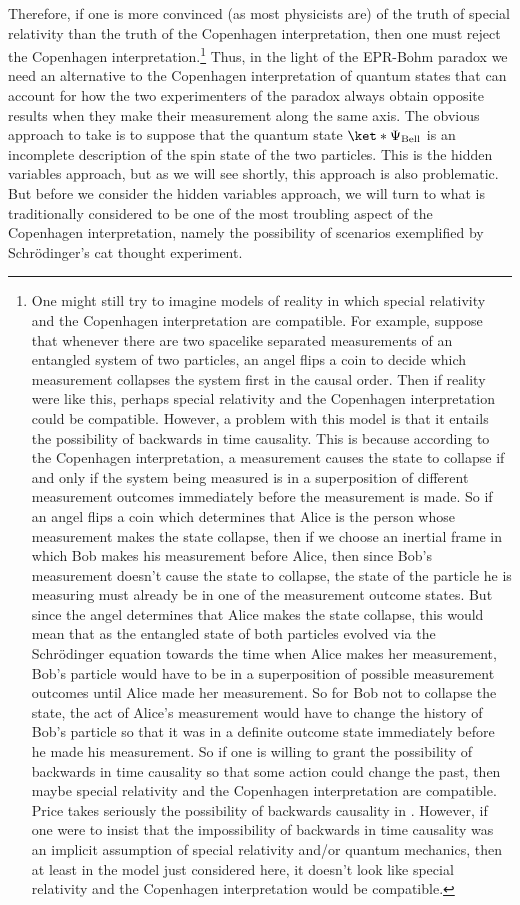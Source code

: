 \documentclass[12pt]{report}
\begin{document}
Therefore, if one is more convinced (as most physicists are) of the truth of special relativity than the truth of the Copenhagen interpretation, then one must reject the Copenhagen interpretation.\footnote{One might still try to imagine models of reality in which special relativity and the Copenhagen interpretation are compatible. For example, suppose that whenever there are two spacelike separated measurements of an entangled system of two particles, an angel flips a coin to decide which measurement collapses the system first in the causal order. Then if reality were like this, perhaps special relativity and the Copenhagen interpretation could be compatible. However, a problem with this model is that it entails the possibility of backwards in time causality. This is because according to the Copenhagen interpretation, a measurement causes the state to collapse if and only if the system being measured is in a superposition of different measurement outcomes immediately before the measurement is made. So if an angel flips a coin which determines that Alice is the person whose measurement makes the state collapse, then if we choose an inertial frame in which Bob makes his measurement before Alice, then since Bob's measurement doesn't cause the state to collapse, the state of the particle he is measuring must already be in one of the measurement outcome states. But since the angel determines that Alice makes the state collapse, this would mean that as the entangled state of both particles evolved via the Schr\"{o}dinger equation towards the time when Alice makes her measurement, Bob's particle would have to be in a superposition of possible measurement outcomes until Alice made her measurement. So for Bob not to collapse the state, the act of Alice's measurement would have to change the history of Bob's particle so that it was in a definite outcome state immediately before he made his measurement. So if one is willing to grant the possibility of backwards in time causality so that some action could change the past, then maybe special relativity and the Copenhagen interpretation are compatible. Price takes seriously the possibility of backwards causality in \cite{PriceHuw1994ANRt}. However, if one were to insist that the impossibility of backwards in time causality was an implicit assumption of special relativity and/or quantum mechanics, then at least in the model just considered here, it doesn't look like special relativity and the Copenhagen interpretation would be compatible.} Thus, in the light of the EPR-Bohm paradox we need an alternative to the Copenhagen interpretation of quantum states that can account for how the two experimenters of the paradox always obtain opposite results when they make their measurement along the same axis. The obvious approach to take is to suppose that the quantum state $\ket*{\Psi_{\text{Bell}}}$ is an incomplete description of the spin state of the two particles. This is the hidden variables approach, but as we will see shortly, this approach is also problematic. But before we consider the hidden variables approach, we will turn to what is traditionally considered to be one of the most troubling aspect of the Copenhagen interpretation, namely the possibility of scenarios exemplified by Schr\"{o}dinger's cat thought experiment.
\end{document}
